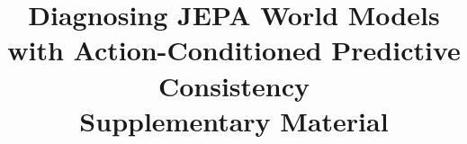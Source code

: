 
\title{Diagnosing JEPA World Models with Action-Conditioned Predictive Consistency\\[1ex]Supplementary Material}

\maketitle
\appendix
\acpcRestoreMainCounters

\FloatBarrier
\clearpage



